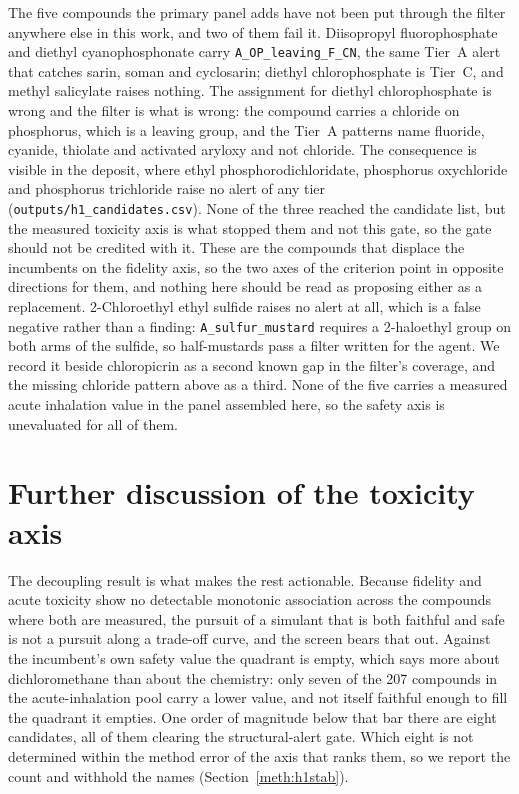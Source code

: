 \documentclass[11pt,a4paper]{article}
\begin{document}
The five compounds the primary panel adds have not been put through the filter
anywhere else in this work, and two of them fail it. Diisopropyl
fluorophosphate and diethyl cyanophosphonate carry \texttt{A\_OP\_leaving\_F\_CN},
the same Tier~A alert that catches sarin, soman and cyclosarin; diethyl
chlorophosphate is Tier~C, and methyl
salicylate raises nothing. The assignment for diethyl chlorophosphate is wrong
and the filter is what is wrong: the compound carries a chloride on phosphorus,
which is a leaving group, and the Tier~A patterns name fluoride, cyanide,
thiolate and activated aryloxy and not chloride. The consequence is visible in
the deposit, where ethyl phosphorodichloridate, phosphorus oxychloride and
phosphorus trichloride raise no alert of any tier
(\texttt{outputs/h1\_candidates.csv}). None of the three reached the candidate
list, but the measured toxicity axis is what stopped them and not this gate, so
the gate should not be credited with it. These are the compounds that displace the incumbents
on the fidelity axis, so the two axes of the criterion point in opposite
directions for them, and nothing here should be read as proposing either as a
replacement. 2-Chloroethyl ethyl sulfide raises no alert at all, which is a
false negative rather than a finding: \texttt{A\_sulfur\_mustard} requires a
2-haloethyl group on both arms of the sulfide, so half-mustards pass a filter
written for the agent. We record it beside chloropicrin as a second known gap
in the filter's coverage, and the missing chloride pattern above as a third. None of the five carries a measured acute inhalation
value in the panel assembled here, so the safety axis is unevaluated for all
of them.


\section{Further discussion of the toxicity axis}
\label{disc:toxaxis}

The decoupling result is what makes the rest actionable. Because fidelity and
acute toxicity show no detectable monotonic association across the compounds
where both are measured, the
pursuit of a simulant that is both faithful and safe is not a pursuit along a
trade-off curve, and the screen bears that out. Against the incumbent's own
safety value the quadrant is empty, which says more about dichloromethane than
about the chemistry: only seven of the 207 compounds in the
acute-inhalation pool carry a lower value, and not itself faithful enough to fill the quadrant it empties. One order
of magnitude below that bar there are eight candidates, all of
them clearing the structural-alert gate. Which eight is not determined within
the method error of the axis that ranks them, so we report the count and
withhold the names (Section~\ref{meth:h1stab}).
\end{document}
